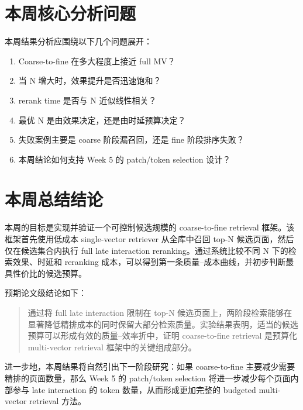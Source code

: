 \documentclass[UTF8,a4paper,12pt]{ctexart}
\begin{document}
	\section{本周核心分析问题}
	
	本周结果分析应围绕以下几个问题展开：
	
	\begin{enumerate}[leftmargin=2em]
		\item Coarse-to-fine 在多大程度上接近 full MV？
		\item 当 N 增大时，效果提升是否迅速饱和？
		\item rerank time 是否与 N 近似线性相关？
		\item 最优 N 是由效果决定，还是由时延预算决定？
		\item 失败案例主要是 coarse 阶段漏召回，还是 fine 阶段排序失败？
		\item 本周结论如何支持 Week 5 的 patch/token selection 设计？
	\end{enumerate}
	
	\section{本周总结结论}
	
	本周的目标是实现并验证一个可控制候选规模的 coarse-to-fine retrieval 框架。该框架首先使用低成本 single-vector retriever 从全库中召回 top-N 候选页面，然后仅在候选集合内执行 full late interaction reranking。通过系统比较不同 N 下的检索效果、时延和 reranking 成本，可以得到第一条质量--成本曲线，并初步判断最具性价比的候选预算。
	
	预期论文级结论如下：
	
	\begin{quote}
		通过将 full late interaction 限制在 top-N 候选页面上，两阶段检索能够在显著降低精排成本的同时保留大部分检索质量。实验结果表明，适当的候选预算可以形成有效的质量--效率折中，证明 coarse-to-fine retrieval 是预算化 multi-vector retrieval 框架中的关键组成部分。
	\end{quote}
	
	进一步地，本周结果将自然引出下一阶段研究：如果 coarse-to-fine 主要减少需要精排的页面数量，那么 Week 5 的 patch/token selection 将进一步减少每个页面内部参与 late interaction 的 token 数量，从而形成更加完整的 budgeted multi-vector retrieval 方法。
	
\end{document}
